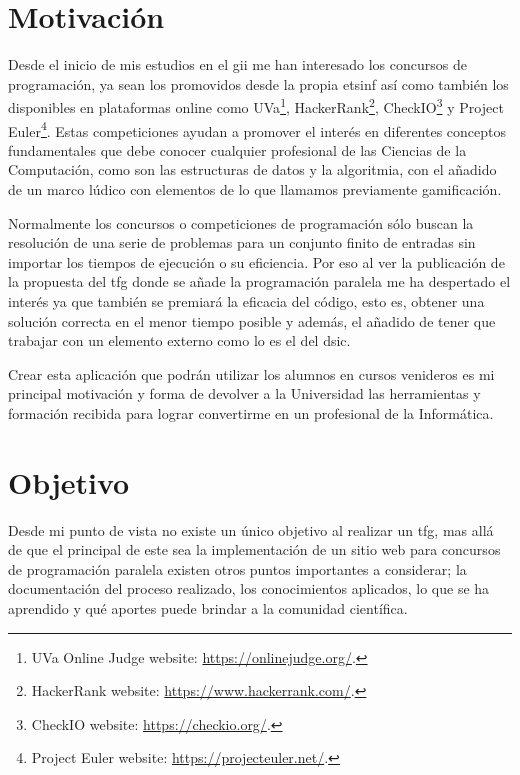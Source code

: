 \documentclass[11pt,spanish,listoffigures,listoftables]{tfgetsinf}
\begin{document}
\section{Motivación}

Desde el inicio de mis estudios en el \acrshort{gii} me han interesado los concursos de programación, ya sean los promovidos desde la propia \acrshort{etsinf} así como también los disponibles en plataformas online como UVa\footnote{UVa Online Judge website: \url{https://onlinejudge.org/}.}, HackerRank\footnote{HackerRank website: \url{https://www.hackerrank.com/}.}, CheckIO\footnote{CheckIO website: \url{https://checkio.org/}.} y Project Euler\footnote{Project Euler website: \url{https://projecteuler.net/}.}. Estas competiciones ayudan a promover el interés en diferentes conceptos fundamentales que debe conocer cualquier profesional de las Ciencias de la Computación, como son las estructuras de datos y la algoritmia, con el añadido de un marco lúdico con elementos de lo que llamamos previamente gamificación. \par

Normalmente los concursos o competiciones de programación sólo buscan la resolución de una serie de problemas para un conjunto finito de entradas sin importar los tiempos de ejecución o su eficiencia. Por eso al ver la publicación de la propuesta del \acrfull{tfg} donde se añade la programación paralela me ha despertado el interés ya que también se premiará la eficacia del código, esto es, obtener una solución correcta en el menor tiempo posible y además, el añadido de tener que trabajar con un elemento externo como lo es el  \kahan del \acrfull{dsic}.  \par

Crear esta aplicación que podrán utilizar los alumnos en cursos venideros es mi principal motivación y forma de devolver a la Universidad las herramientas y formación recibida para lograr convertirme en un profesional de la Informática. 

\section{Objetivo}

Desde mi punto de vista no existe un único objetivo al realizar un \acrshort{tfg}, mas allá de que el principal de este sea la implementación de un sitio web para concursos de programación paralela existen otros puntos importantes a considerar; la documentación del proceso realizado, los conocimientos aplicados, lo que se ha aprendido y qué aportes puede brindar a la comunidad científica. \par 
\end{document}
